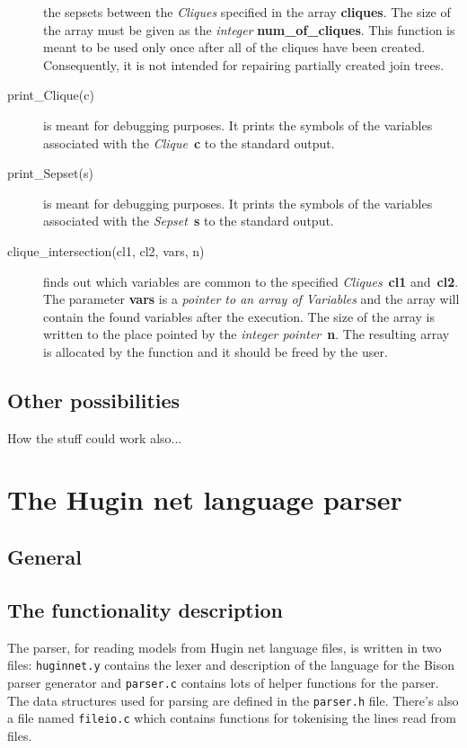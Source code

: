 \documentclass[12pt,a4paper]{report}
\begin{document}
\begin{description}
the sepsets between the {\it Cliques} specified in the array 
\textbf{cliques}. The size of the array must be given as the 
{\it integer} \textbf{num\_of\_cliques}. This function is meant to be
used only once after all of the cliques have been created. 
Consequently, it is not intended for repairing partially created 
join trees.
\item[print\_Clique(c)] is meant for debugging purposes. It prints the
symbols of the variables associated with the {\it Clique}~\textbf{c}
to the standard output.
\item[print\_Sepset(s)] is meant for debugging purposes. It prints the
symbols of the variables associated with the {\it Sepset}~\textbf{s}
to the standard output.
\item[clique\_intersection(cl1, cl2, vars, n)] finds out which
variables are common to the specified {\it Cliques}~\textbf{cl1}
and~\textbf{cl2}. The parameter \textbf{vars} is a {\it pointer to an
array of Variables} and the array will contain the found variables 
after the execution. The size of the array is written to the place 
pointed by the {\it integer pointer}~\textbf{n}. The resulting array
is allocated by the function and it should be freed by the user.

\end{description}


\subsection{Other possibilities}

How the stuff could work also...


\newpage
\section{The Hugin net language parser}
\subsection{General}


\subsection{The functionality description}
The parser, for reading models from Hugin net language files, is
written in two files: \verb+huginnet.y+ contains the lexer and 
description of the language for the Bison parser generator and 
\verb+parser.c+ contains lots of helper functions for the parser. 
The data structures used for parsing are defined in the
\verb+parser.h+ file. There's also a file named \verb+fileio.c+ which 
contains functions for tokenising the lines read from files.
\end{document}
